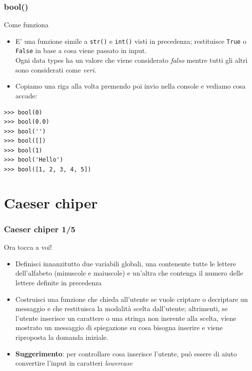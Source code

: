 \documentclass{beamer}
\begin{document}
\begin{frame}[fragile]
\frametitle{bool()}
\begin{block}{Come funziona}
	\begin{itemize}
		\item E' una funzione simile a \texttt{str()} e \texttt{int()} visti in precedenza; restituisce \texttt{True} o \texttt{False} in base a cosa viene passato in input. \\ Ogni data types ha un valore che viene considerato \textit{falso} mentre tutti gli altri sono considerati come \textit{veri}.
		\item Copiamo una riga alla volta premendo poi invio nella console e vediamo cosa accade:
	\end{itemize}
\end{block}
\begin{lstlisting}
>>> bool(0)
>>> bool(0.0)
>>> bool('')
>>> bool([])
>>> bool(1)
>>> bool('Hello')
>>> bool([1, 2, 3, 4, 5])
\end{lstlisting}
\end{frame}

\section{Caeser chiper}

\begin{frame}[fragile]
\frametitle{Caeser chiper 1/5}
\begin{block}{Ora tocca a voi!}
	\begin{itemize}
		\item Definisci innanzitutto due variabili globali, una contenente tutte le lettere dell'alfabeto (minuscole e maiuscole) e un'altra che contenga il numero delle lettere definite in precedenza
		\item Costruisci una funzione che chieda all'utente se vuole criptare o decriptare un messaggio e che restituisca la modalità scelta dall'utente; altrimenti, se l'utente inserisce un carattere o una stringa non inerente alla scelta, viene mostrato un messaggio di spiegazione su cosa bisogna inserire e viene riproposta la domanda iniziale.
		\item \textbf{Suggerimento}: per controllare cosa inserisce l'utente, può essere di aiuto convertire l'input in caratteri \textit{lowercase} 
	\end{itemize}
\end{block}
\end{frame}
\end{document}
